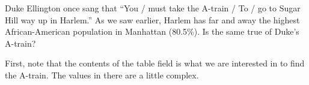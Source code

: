 \documentclass[a4paper,11pt,english]{sphinxmanual}
\begin{document}
Duke Ellington once sang that “You / must take the A-train / To / go to Sugar Hill way up in Harlem.” As we saw earlier, Harlem has far and away the highest African-American population in Manhattan (80.5\%). Is the same true of Duke’s A-train?

First, note that the contents of the  table  field is what we are interested in to find the A-train. The values in there are a little complex.

\begin{sphinxVerbatim}[commandchars=\\\{\}]
    
\end{sphinxVerbatim}
\end{document}
